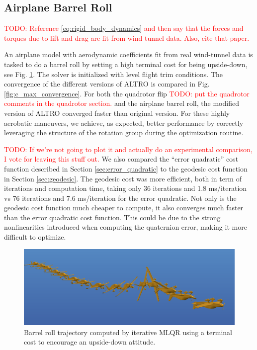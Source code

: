\documentclass[letterpaper, 10 pt, conference]{ieeeconf}  %
\newcommand{\todo}[1]{\textcolor{red}{TODO: #1}}
\begin{document}
    \subsection{Airplane Barrel Roll}
\todo{Reference \eqref{eq:rigid_body_dynamics} and then say that the forces and torques due to lift and drag are fit from wind tunnel data. Also, cite that paper.}

        An airplane model with aerodynamic coefficients fit from real wind-tunnel data is
        tasked to do a barrel roll by setting a high terminal cost for being upside-down,
        see Fig. \ref{fig:barrellroll}. The solver is initialized with level flight trim
        conditions. The convergence of the different versions of ALTRO is compared in Fig.
        \ref{fig:c_max_convergence}. For both the quadrotor flip \todo{put the quadrotor comments in the quadrotor section.} and the airplane barrel 
        roll, the modified version of ALTRO converged faster than original version.
        For these highly aerobatic maneuvers, we achieve, as expected, better
        performance by correctly leveraging the structure of the rotation group during
        the optimization routine.

		\todo{If we're not going to plot it and actually do an experimental comparison, I vote for leaving this stuff out.}
        We also compared the ``error quadratic'' cost function described in Section
        \ref{sec:error_quadratic} to the geodesic cost function in Section
        \ref{sec:geodesic}. The geodesic cost was more efficient, both in term of
        iterations and computation time, taking only 36 iterations and 1.8 ms/iteration
        vs 76 iterations and 7.6 ms/iteration for the error quadratic. Not only is the
        geodesic cost function much cheaper to compute, it also converges much faster
        than the error quadratic cost function. This could be due to the strong nonlinearities
        introduced when computing the quaternion error, making it more difficult to
        optimize.
        
        \begin{figure}[h]
            \centering
            \includegraphics[width=\columnwidth]{figures/barrellroll.png}
            \caption{Barrel roll trajectory computed by iterative MLQR using a terminal cost to encourage an upside-down attitude.}
            \label{fig:barrellroll}
        \end{figure}
\end{document}
